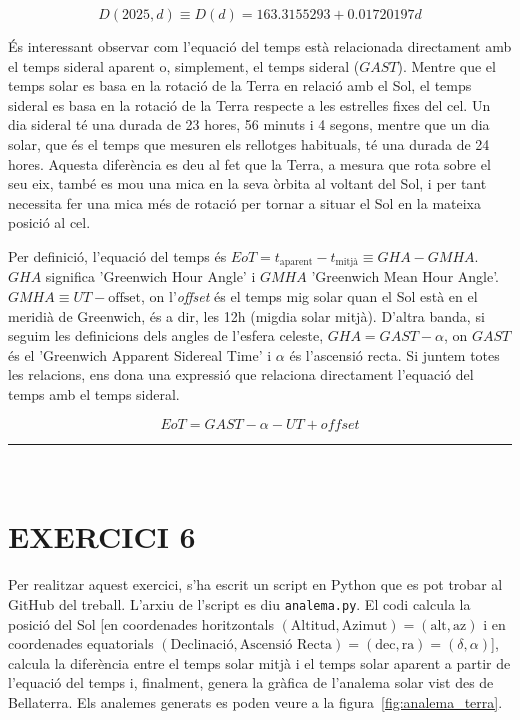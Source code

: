 \documentclass[a4paper, 11pt]{article}
\begin{document}
\begin{equation} \label{D_2025}
    \boxed{D(2025,d) \equiv D(d) = 163.3155293 + 0.01720197d}
\end{equation}
\vspace{2mm}

\noindent És interessant observar com l'equació del temps està relacionada directament amb el temps sideral aparent o, simplement, el temps sideral ($GAST$). Mentre que el temps solar es basa en la rotació de la Terra en relació amb el Sol, el temps sideral es basa en la rotació de la Terra respecte a les estrelles fixes del cel. Un dia sideral té una durada de 23 hores, 56 minuts i 4 segons, mentre que un dia solar, que és el temps que mesuren els rellotges habituals, té una durada de 24 hores. Aquesta diferència es deu al fet que la Terra, a mesura que rota sobre el seu eix, també es mou una mica en la seva òrbita al voltant del Sol, i per tant necessita fer una mica més de rotació per tornar a situar el Sol en la mateixa posició al cel.

\vspace{2mm}

\noindent Per definició, l'equació del temps és $EoT = t_{\text{aparent}} - t_{\text{mitjà}} \equiv GHA - GMHA$. $GHA$ significa 'Greenwich Hour Angle' i $GMHA$ 'Greenwich Mean Hour Angle'. $GMHA \equiv UT - \text{offset}$, on l'\textit{offset} és el temps mig solar quan el Sol està en el meridià de Greenwich, és a dir, les 12h (migdia solar mitjà). D'altra banda, si seguim les definicions dels angles de l'esfera celeste, $GHA = GAST - \alpha$, on $GAST$ és el 'Greenwich Apparent Sidereal Time' i $\alpha$ és l'ascensió recta. Si juntem totes les relacions, ens dona una expressió que relaciona directament l'equació del temps amb el temps sideral.

\begin{equation}
    EoT = GAST - \alpha - UT + offset
    \label{eq:EoT_ST}
\end{equation}

\vspace{10mm}
\hrule\
\vspace{5mm}


\section*{EXERCICI 6}

\noindent Per realitzar aquest exercici, s'ha escrit un script en Python que es pot trobar al GitHub del treball. L'arxiu de l'script es diu \texttt{analema.py}. El codi calcula la posició del Sol [en coordenades horitzontals $(\text{Altitud}, \text{Azimut}) = (\text{alt}, \text{az})$ i en coordenades equatorials $(\text{Declinació}, \text{Ascensió Recta}) = (\text{dec}, \text{ra}) = (\delta, \alpha)$], calcula la diferència entre el temps solar mitjà i el temps solar aparent a partir de l’equació del temps i, finalment, genera la gràfica de l’analema solar vist des de Bellaterra. Els analemes generats es poden veure a la figura~\ref{fig:analema_terra}.
\end{document}
